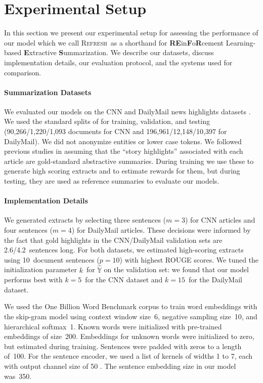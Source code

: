 \documentclass[11pt,a4paper]{article}
\newcommand\refresh{\textsc{Refresh}}
\begin{document}
\section{Experimental Setup}
\label{sec:experiments}

In this section we present our experimental setup for assessing the
performance of our model which we call \refresh\ as a shorthand for
\textbf{RE}in\textbf{F}o\textbf{R}cement Learning-based
\textbf{E}xtractive \textbf{S}ummarization. We describe our datasets,
discuss implementation details, our evaluation protocol, and the
systems used for comparison.

\paragraph{Summarization Datasets}

We evaluated our models on the CNN and DailyMail news highlights
datasets \cite{hermann-nips15}. We used the standard splits of
 for training, validation, and testing
(90,266/1,220/1,093 documents for CNN and 196,961/12,148/10,397 for
DailyMail).  We did not anonymize entities or lower case tokens. We
followed previous studies
\cite{jp-acl16,nallapati-signll16,nallapati17,see-acl17,tanwan-acl17}
in assuming that the ``story highlights'' associated with each article
are gold-standard abstractive summaries.  During training we use these
to generate high scoring extracts and to estimate rewards for them,
but during testing, they are used as reference summaries to evaluate
our models.






\paragraph{Implementation Details}

We generated extracts by selecting three sentences ($m=3$) for CNN
articles and four sentences ($m=4$) for DailyMail articles. These
decisions were informed by the fact that gold highlights in the
CNN/DailyMail validation sets are 2.6/4.2~sentences long.  For both
datasets, we estimated high-scoring extracts using 10~document
sentences ($p=10$) with highest ROUGE scores. We tuned the
initialization parameter $k$~for $\hat{\mathbb{Y}}$ on the validation
set: we found that our model performs best with $k=5$~for the CNN
dataset and $k=15$~for the DailyMail dataset.

We used the One Billion Word Benchmark corpus \cite{billionbenchmark}
to train word embeddings with the skip-gram model \cite{word2vec}
using context window size~6, negative sampling size~10, and
hierarchical softmax~1.  Known words were initialized with pre-trained
embeddings of size~200. Embeddings for unknown words were initialized
to zero, but estimated during training. Sentences were padded with
zeros to a length of~100. For the sentence encoder, we used a list of
kernels of widths 1 to 7, each with output channel size of 50
\cite{kim-aaai16}. The sentence embedding size in our model was~350.
\end{document}
